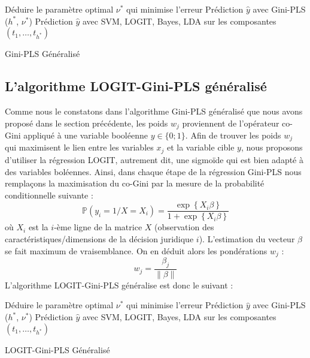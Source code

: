 \begin{algorithm}[H]
	\scriptsize
	Déduire le paramètre optimal $\nu^*$ qui minimise l'erreur \; 
	\Return Prédiction $\hat{y}$ avec Gini-PLS ($h^*$, $\nu^*$) \;
	\Return Prédiction $\hat{y}$ avec SVM, LOGIT, Bayes, LDA sur les composantes $(t_1,\ldots,t_{h^*})$\;
	\caption{Gini-PLS Généralisé}\label{G-GPLS}
\end{algorithm}
\bigskip

\subsection{L'algorithme LOGIT-Gini-PLS généralisé} 

Comme nous le constatons dans l'algorithme Gini-PLS généralisé que nous avons proposé dans le section précédente, les poids $w_j$ proviennent de l'opérateur co-Gini appliqué à une variable booléenne $y \in \lbrace 0;1 \rbrace$. Afin de trouver les poids $w_j$ qui maximisent le lien entre les variables $x_j$ et la variable cible $y$, nous proposons d'utiliser la régression LOGIT, autrement dit, une sigmoïde qui est bien adapté à des variables boléennes. Ainsi, dans chaque étape de la régression Gini-PLS nous remplaçons la maximisation du co-Gini par la mesure de la probabilité conditionnelle suivante :
\begin{equation}\tag{LOGIT}
\mathbb{P}(y_i = 1 / X = X_i) = \frac{\exp\left\{X_i \beta \right\}}{1+\exp\left\{ X_i \beta \right\}}
\end{equation}
où $X_i$ est la $i$-ème ligne de la matrice $X$ (observation des caractéristiques/dimensions de la décision juridique $i$). L'estimation du vecteur $\beta$ se fait maximum de vraisemblance. On en déduit alors les pondérations $w_j$ :
\[
w_j = \frac{\beta_j}{\| \beta\|}
\]
L'algorithme LOGIT-Gini-PLS généralise est donc le suivant :

\begin{algorithm}[H]
	\scriptsize
	Déduire le paramètre optimal $\nu^*$ qui minimise l'erreur \; 
	\Return Prédiction $\hat{y}$ avec Gini-PLS ($h^*$, $\nu^*$) \;
	\Return Prédiction $\hat{y}$ avec SVM, LOGIT, Bayes, LDA sur les composantes $(t_1,\ldots,t_{h^*})$\;
	\caption{LOGIT-Gini-PLS Généralisé}\label{G-GPLS}
\end{algorithm}


